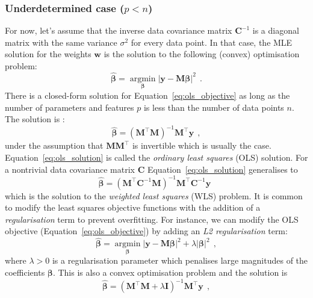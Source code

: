\documentclass[12pt,dvipsnames]{report}
\renewcommand{\vec}[1]{\boldsymbol{\mathbf{#1}}}
\newcommand{\hquad}{~~}
\begin{document}
\subsubsection{Underdetermined case ($p < n$)}
For now, let's assume that the inverse data covariance matrix $\vec{C}^{-1}$ is
a diagonal matrix with the same variance $\sigma^2$ for every data point.
In that case, the MLE solution for the weights $\vec{w}$ is the solution to the
following (convex) optimisation problem:
\begin{equation}
    \hat{\vec\beta}=
    \underset{\vec \beta}{\operatorname{argmin}}\left|\vec{y}-\vec{M} \vec\beta\right|^{2}
    \hquad.
    \label{eq:ols_objective}
\end{equation}
There is a closed-form solution for Equation~\ref{eq:ols_objective} as long as the number
of parameters and features $p$ is less than the number of data points $n$. The solution
is \citep{arXiv:2101.07256}:
\begin{equation}
    \hat{\vec\beta}=(\vec{M}^{\intercal} \vec{M})^{-1} \vec{M}^{\intercal} \vec{y}
    \hquad,
    \label{eq:ols_solution}
\end{equation}
under the assumption that $\vec{M}\vec{M}^\intercal$ is invertible which is usually the case.
Equation~\ref{eq:ols_solution} is called the \emph{ordinary least squares} (OLS) solution.
For a nontrivial data covariance matrix $\vec{C}$ Equation~\ref{eq:ols_solution} generalises
to
\begin{equation}
    \hat{\vec\beta}=(\vec{M}^{\intercal}\vec{C}^{-1}\vec{M})^{-1} \vec{M}^{\intercal}\vec{C}^{-1} \vec{y}
    \hquad
    \label{eq:wls_solution}
\end{equation}
which is the solution to the \emph{weighted least squares} (WLS) problem.
It is common to modify the least squares objective functions with the addition of a
\emph{regularisation} term to prevent overfitting. For instance, we can modify the OLS
objective (Equation~\ref{eq:ols_objective}) by adding an \emph{L2 regularisation} term:
\begin{equation}
    \hat{\vec\beta}=
    \underset{\vec \beta}{\operatorname{argmin}}\left|\vec{y}-\vec{M} \vec\beta\right|^{2} + \lambda \left|\vec\beta\right|^2
    \hquad,
    \label{eq:ols_objective_l2}
\end{equation}
where $\lambda >0$ is a regularisation parameter
which penalises large magnitudes of the coefficients $\vec\beta$. This is also a convex
optimisation problem and the solution is
\begin{equation}
    \hat{\vec\beta}=(\vec{M}^{\intercal} \vec{M} + \lambda\vec{I})^{-1} \vec{M}^{\intercal} \vec{y}
    \hquad,
    \label{eq:ols_solution_l2}
\end{equation}
\end{document}
